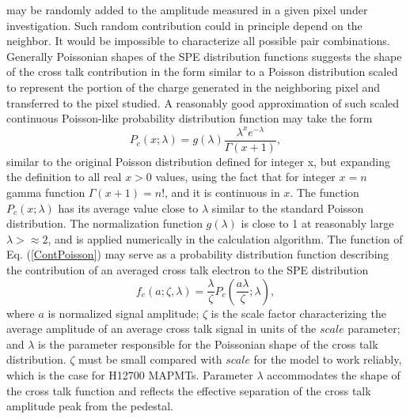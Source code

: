 may be randomly added to the amplitude measured in a given pixel under investigation. Such random contribution could in principle depend on the neighbor. It would be impossible to characterize all possible pair combinations. Generally Poissonian shapes of the SPE distribution functions suggests the shape of the cross talk contribution in the form similar to a Poisson distribution scaled to represent the portion of the charge generated in the neighboring pixel and transferred to the pixel studied. A reasonably good approximation of such scaled continuous Poisson-like probability distribution function may take the form 
\begin{equation}
\label{ContPoisson}
 P_c(x;\lambda) = g(\lambda) \frac{\lambda^{x} e^{-\lambda}}{\Gamma(x+1)},
\end{equation}
similar to the original Poisson distribution defined for integer x, but expanding the definition to all real $x>0$ values, using the fact that for integer $x = n$ gamma function $\Gamma(x+1) = n!$, and it is continuous in $x$. The function $ P_c(x;\lambda) $ has its average value close to $\lambda$ similar to the standard Poisson distribution. The normalization function $g(\lambda)$ is close to 1 at reasonably large $\lambda > \approx 2$, and is applied numerically in the calculation algorithm. The function of Eq. (\ref{ContPoisson}) may serve as a probability distribution function describing the contribution of an averaged cross talk electron to the SPE distribution
\begin{equation}
\label{fe}
 f_{e}(a;\zeta,\lambda) = \frac{\lambda}{\zeta} P_c \left (\frac{a \lambda}{\zeta};\lambda \right ),
\end{equation}
where $a$ is normalized signal amplitude; $\zeta$ is the scale factor characterizing the average amplitude of an average cross talk signal in units of the $scale$ parameter; and $\lambda$ is the parameter responsible for the Poissonian shape of the cross talk distribution. $\zeta$ must be small compared with $scale$ for the model to work reliably, which is the case for H12700 MAPMTs. Parameter $\lambda$ accommodates the shape of the cross talk function and reflects the effective separation of the cross talk amplitude peak from the pedestal.

